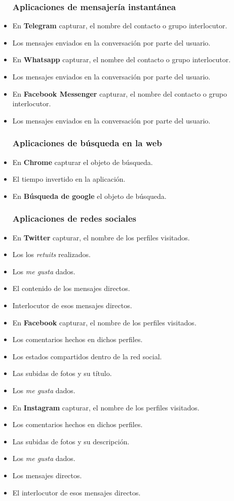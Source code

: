 \documentclass[12pt,a4paper,oneside]{book} %
\begin{document}
\begin{itemize}
\subsubsection{Aplicaciones de mensajería instantánea}
  \item En \textbf{Telegram} capturar, el nombre del contacto o grupo interlocutor. 
  \item Los mensajes enviados en la conversación por parte del usuario. 
  \item En \textbf{Whatsapp} capturar, el nombre del contacto o grupo interlocutor. 
  \item Los mensajes enviados en la conversación por parte del usuario. 
  \item En \textbf{Facebook Messenger} capturar, el nombre del contacto o grupo interlocutor. 
  \item Los mensajes enviados en la conversación por parte del usuario. 
\subsubsection{Aplicaciones de búsqueda en la web}
  \item En \textbf{Chrome} capturar el objeto de búsqueda. 
  \item El tiempo invertido en la aplicación. 
  \item En \textbf{Búsqueda de google} el objeto de búsqueda. 
\subsubsection{Aplicaciones de redes sociales}
  \item En \textbf{Twitter} capturar, el nombre de los perfiles visitados. 
  \item Los los \textit{retuits} realizados. 
  \item Los \textit{me gusta} dados. 
  \item El contenido de los mensajes directos. 
  \item Interlocutor de esos mensajes directos. 
  \item En \textbf{Facebook} capturar, el nombre de los perfiles visitados. 
  \item Los comentarios hechos en dichos perfiles. 
  \item Los estados compartidos dentro de la red social. 
  \item Las subidas de fotos y su título. 
  \item Los \textit{me gusta} dados. 
  \item En \textbf{Instagram} capturar, el nombre de los perfiles visitados. 
  \item Los comentarios hechos en dichos perfiles. 
  \item Las subidas de fotos y su descripción. 
  \item Los \textit{me gusta} dados.
  \item Los mensajes directos. 
  \item El interlocutor de esos mensajes directos. 
\end{itemize}
\end{document}
